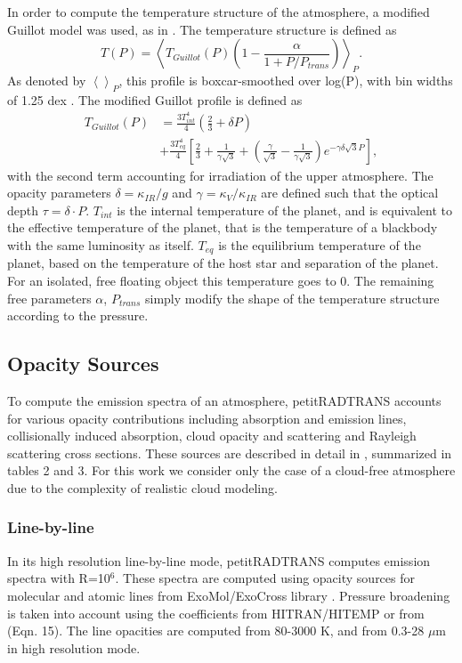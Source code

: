 In order to compute the temperature structure of the atmosphere, a modified Guillot model \parencite{Guillot2010} was used, as in \parencite{Molliere2017,Molliere2019}.
The temperature structure is defined as 
\begin{equation}
T(P) = \left<T_{Guillot}(P)\left(1-\frac{\alpha}{1+P/P_{trans}}\right)\right>_{P}.
\end{equation}
As denoted by $\left<\right>_{P}$, this profile is boxcar-smoothed over log(P), with bin widths of 1.25 dex \parencite{Molliere2019}. 
The modified Guillot profile is defined as
\begin{align}
T_{Guillot}(P) &= \frac{3T^{4}_{int}}{4}\left(\frac{2}{3} + \delta P\right)\\
&+\frac{3T^{4}_{eq}}{4}\left[\frac{2}{3} + \frac{1}{\gamma\sqrt{3}} + \left(\frac{\gamma}{\sqrt{3}} - \frac{1}{\gamma\sqrt{3}}\right)e^{-\gamma\delta\sqrt{3}P}\right],
\end{align}
with the second term accounting for irradiation of the upper atmosphere.
The opacity parameters $\delta=\kappa_{IR}/g$ and  $\gamma=\kappa_{V}/\kappa_{IR}$ are defined such that the optical depth $\tau=\delta\cdot P$. 
$T_{int}$ is the internal temperature of the planet, and is equivalent to the effective temperature of the planet, that is the temperature of a blackbody with the same luminosity as itself.
$T_{eq}$ is the equilibrium temperature of the planet, based on the temperature of the host star and separation of the planet. 
For an isolated, free floating object this temperature goes to 0.
The remaining free parameters $\alpha$, $P_{trans}$ simply modify the shape of the temperature structure according to the pressure.

\subsection{Opacity Sources}
To compute the emission spectra of an atmosphere, petitRADTRANS accounts for various opacity contributions including absorption and emission lines, collisionally induced absorption, cloud opacity and scattering and Rayleigh scattering cross sections. These sources are described in detail in \parencite{Molliere2019}, summarized in tables 2 and 3. For this work we consider only the case of a cloud-free atmosphere due to the complexity of realistic cloud modeling.
\subsubsection{Line-by-line}
In its high resolution line-by-line mode, petitRADTRANS computes emission spectra with R=10$^{6}$. 
These spectra are computed using opacity sources for molecular and atomic lines from ExoMol/ExoCross library \parencite{Yurchenko2018}. Pressure broadening is taken into account using the coefficients from HITRAN/HITEMP \parencite{Rothman2010,Rothman2013} or from \parencite{Sharp2007} (Eqn. 15). The line opacities are computed from 80-3000 K, and from 0.3-28 $\mu$m in high resolution mode.
